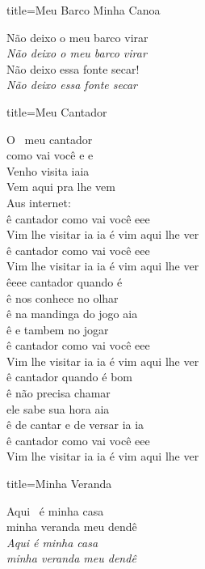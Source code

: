 \documentclass[fontsize=14pt, paper=a4, twoside, DIV=20]{scrreprt} %
\begin{document}
\begin{multicols*}{2}
\begin{song}{title={Meu Barco Minha Canoa}}
\begin{verse*}
            Não deixo o meu barco virar\\
            \textit{Não deixo o meu barco virar}\\
            Não deixo essa fonte secar!\\
            \textit{Não deixo essa fonte secar}\\
        \end{verse*}
\end{song}
\begin{song}{title={Meu Cantador}}
        \begin{verse*}
            O \ meu cantador\\
            como vai você e e\\
            Venho visita iaia\\
            Vem aqui pra lhe vem\\
            Aus internet:\\
            ê cantador como vai você eee\\
            Vim lhe visitar ia ia é vim aqui lhe ver\\
            ê cantador como vai você eee\\
            Vim lhe visitar ia ia é vim aqui lhe ver\\
            êeee cantador quando é\\
            ê nos conhece no olhar\\
            ê na mandinga do jogo aia\\
            ê e tambem no jogar\\
            ê cantador como vai você eee\\
            Vim lhe visitar ia ia é vim aqui lhe ver\\
            ê cantador quando é bom\\
            ê não precisa chamar\\
            ele sabe sua hora aia\\
            ê de cantar e de versar ia ia\\
            ê cantador como vai você eee\\
            Vim lhe visitar ia ia é vim aqui lhe ver\\
        \end{verse*}
\end{song}

\begin{song}{title={Minha Veranda}}
        \begin{verse*}
            Aqui \ é minha casa\\
            minha veranda meu dendê\\
            \textit{Aqui é minha casa}\\
            \textit{minha veranda meu dendê}\\


\end{verse*}
\end{song}
\end{multicols*}
\end{document}
